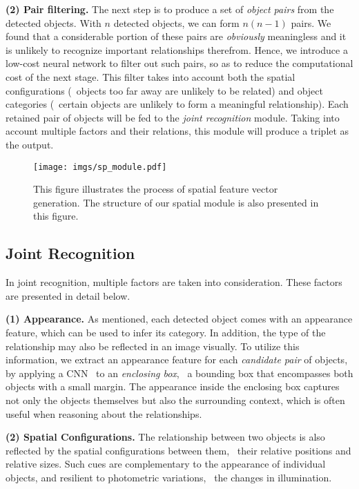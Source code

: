 \documentclass[10pt,twocolumn,letterpaper]{article}
\begin{document}
\textbf{(2) Pair filtering.}
The next step is to produce a set of \emph{object pairs} from the detected
objects. With $n$ detected objects, we can form $n (n - 1)$ pairs.
We found that a considerable portion of these pairs are \emph{obviously} 
meaningless and it is unlikely to recognize important relationships therefrom.
Hence, we introduce a low-cost neural network to filter out such pairs,
so as to reduce the computational cost of the next stage. 
This filter takes into account both the spatial configurations 
(\eg~objects too far away are unlikely to be related)
and object categories 
(\eg~certain objects are unlikely to form a meaningful relationship). 
Each retained pair of objects will be fed to the \emph{joint recognition}
module. 
Taking into account multiple factors and their relations,
this module will produce a triplet as the output.

\begin{figure}
    \centering
    \texttt{[image: imgs/sp\_module.pdf]}
    \caption{\small This figure illustrates the process of spatial feature vector generation. 
		The structure of our spatial module is also presented in this figure.}
    \label{fig:sp_module}
\end{figure}\subsection{Joint Recognition}

In joint recognition, multiple factors are taken into consideration.
These factors are presented in detail below.

\textbf{(1) Appearance.}%
As mentioned, each detected object comes with an appearance feature,
which can be used to infer its category. 
In addition, the type of the relationship may also be
reflected in an image visually.
To utilize this information, we extract an appearance feature for each
\emph{candidate pair} of objects, by applying a CNN~\cite{Simonyan14c,he2015deep} 
to an \emph{enclosing box}, 
\ie~a bounding box that encompasses both objects with a small margin.
%
The appearance inside the enclosing box captures not only the objects themselves
but also the surrounding context, which is often useful when
reasoning about the relationships.

\textbf{(2) Spatial Configurations.}%
The relationship between two objects is also reflected
by the spatial configurations between them, 
\eg~their relative positions and relative sizes.
Such cues are complementary to the appearance of individual objects,
and resilient to photometric variations, \eg~the changes in illumination.
\end{document}
